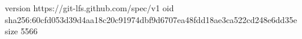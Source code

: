 version https://git-lfs.github.com/spec/v1
oid sha256:60cfd053d39d4aa18c20c91974dbf9d6707ea48fdd18ae3ca522cd248e6dd35e
size 5566
